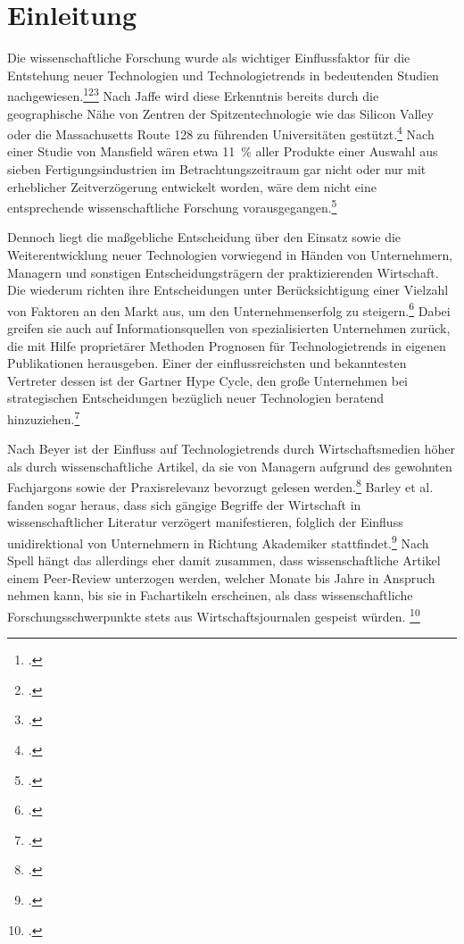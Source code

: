 \section{Einleitung}
Die wissenschaftliche Forschung wurde als wichtiger Einflussfaktor für die Entstehung neuer Technologien und Technologietrends in bedeutenden Studien nachgewiesen.\footcite[Vgl.][S.~187]{Nelson1986}\footcite[Vgl.][S.~11]{Mansfield1991}\footcite[Vgl.][S.~599]{Tegarden2012} Nach Jaffe wird diese Erkenntnis bereits durch die geographische Nähe von Zentren der Spitzentechnologie wie das Silicon Valley oder die Massachusetts Route 128 zu führenden Universitäten gestützt.\footcite[Vgl.][S.~967f]{Jaffe1989} Nach einer Studie von Mansfield wären etwa 11~\% aller Produkte einer Auswahl aus sieben Fertigungsindustrien im Betrachtungszeitraum gar nicht oder nur mit erheblicher Zeitverzögerung entwickelt worden, wäre dem nicht eine entsprechende wissenschaftliche Forschung vorausgegangen.\footcite[Vgl.][S.~2]{Mansfield1991}

Dennoch liegt die maßgebliche Entscheidung über den Einsatz sowie die Weiterentwicklung neuer Technologien vorwiegend in Händen von Unternehmern, Managern und sonstigen Entscheidungsträgern der praktizierenden Wirtschaft. Die wiederum richten ihre Entscheidungen unter Berücksichtigung einer Vielzahl von Faktoren an den Markt aus, um den Unternehmenserfolg zu steigern.\footcite[Vgl.][S.~1652f]{Gruber2008} Dabei greifen sie auch auf Informationsquellen von spezialisierten Unternehmen zurück, die mit Hilfe proprietärer Methoden Prognosen für Technologietrends in eigenen Publikationen herausgeben. Einer der einflussreichsten und bekanntesten Vertreter dessen ist der Gartner Hype Cycle, den große Unternehmen bei strategischen Entscheidungen bezüglich neuer Technologien beratend hinzuziehen.\footcite[Vgl.][S.~254]{Steinert2010}

Nach Beyer ist der Einfluss auf Technologietrends durch Wirtschaftsmedien höher als durch wissenschaftliche Artikel, da sie von Managern aufgrund des gewohnten Fachjargons sowie der Praxisrelevanz bevorzugt gelesen werden.\footcite[Vgl.][S.~472]{Beyer1992} Barley et al. fanden sogar heraus, dass sich gängige Begriffe der Wirtschaft in wissenschaftlicher Literatur verzögert manifestieren, folglich der Einfluss unidirektional von Unternehmern in Richtung Akademiker stattfindet.\footcite[Vgl.][S.~52]{Barley1988} Nach Spell hängt das allerdings eher damit zusammen, dass wissenschaftliche Artikel einem Peer-Review unterzogen werden, welcher Monate bis Jahre in Anspruch nehmen kann, bis sie in Fachartikeln erscheinen, als dass wissenschaftliche Forschungsschwerpunkte stets aus Wirtschaftsjournalen gespeist würden. \footcite[Vgl.][S.~345]{Spell1999} 

